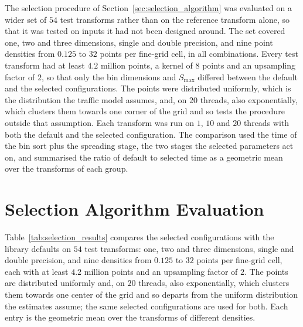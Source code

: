 The selection procedure of Section~\ref{sec:selection_algorithm} was evaluated on a wider set of $54$ test transforms rather than on the reference transform alone, so that it was tested on inputs it had not been designed around. The set covered one, two and three dimensions, single and double precision, and nine point densities from $0.125$ to $32$ points per fine-grid cell, in all combinations. Every test transform had at least $4.2$ million points, a kernel of $8$ points and an upsampling factor of $2$, so that only the bin dimensions and $S_{\max}$ differed between the default and the selected configurations. The points were distributed uniformly, which is the distribution the traffic model assumes, and, on $20$ threads, also exponentially, which clusters them towards one corner of the grid and so tests the procedure outside that assumption. Each transform was run on $1$, $10$ and $20$ threads with both the default and the selected configuration. The comparison used the time of the bin sort plus the spreading stage, the two stages the selected parameters act on, and summarised the ratio of default to selected time as a geometric mean over the transforms of each group.

\section{Selection Algorithm Evaluation}
\label{sec:selection_results}
Table~\ref{tab:selection_results} compares the selected configurations with the library defaults on $54$ test transforms: one, two and three dimensions, single and double precision, and nine densities from $0.125$ to $32$ points per fine-grid cell, each with at least $4.2$ million points and an upsampling factor of $2$. The points are distributed uniformly and, on $20$ threads, also exponentially, which clusters them towards one center of the grid and so departs from the uniform distribution the estimates assume; the same selected configurations are used for both.  Each entry is the geometric mean over the transforms of different densities.

